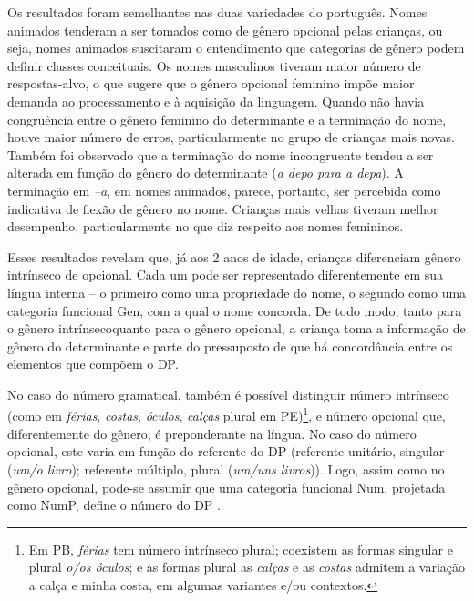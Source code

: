 \documentclass[output=paper]{LSP/langsci}
\begin{document}
Os resultados foram semelhantes nas duas variedades do português. Nomes animados tenderam a ser tomados como de gênero opcional pelas crianças, ou seja, nomes animados suscitaram o entendimento que categorias de gênero podem definir classes conceituais. Os nomes masculinos tiveram maior número de respostas-alvo, o que sugere que o gênero opcional feminino impõe maior demanda ao processamento e à aquisição da linguagem. Quando não havia congruência entre o gênero feminino do determinante e a terminação do nome, houve maior número de erros, particularmente no grupo de crianças mais novas. Também foi observado que a terminação do nome incongruente tendeu a ser alterada em função do gênero do determinante (\textit{a depo para a depa}). A terminação em \textit{–a}, em nomes animados, parece, portanto, ser percebida como indicativa de flexão de gênero no nome. Crianças mais velhas tiveram melhor desempenho, particularmente no que diz respeito aos nomes femininos. 


Esses resultados revelam que, já aos 2 anos de idade, crianças diferenciam gênero intrínseco de opcional. Cada um pode ser representado diferentemente em sua língua interna – o primeiro como uma propriedade do nome, o segundo como uma categoria funcional Gen, com a qual o nome concorda. De todo modo, tanto para o gênero intrínseco\largerpage quanto para o gênero opcional, a criança toma a informação de gênero do determinante e parte do pressuposto de que há concordância entre os elementos que compõem o DP.

No caso do número gramatical, também é possível distinguir número intrínseco (como em \textit{férias}, \textit{costas}, \textit{óculos}, \textit{calças} plural em PE)\footnote{Em PB, \textit{férias} tem número intrínseco plural; coexistem as formas singular e plural \textit{o/os óculos}; e as formas plural as \textit{calças} e as \textit{costas} admitem a variação a calça e minha costa, em algumas variantes e/ou contextos.}, e número opcional que, diferentemente do gênero, é preponderante na língua. No caso do número opcional, este varia em função do referente do DP (referente unitário, singular (\textit{um/o livro}); referente múltiplo, plural (\textit{um/uns livros})). Logo, assim como no gênero opcional, pode-se assumir que uma categoria funcional Num, projetada como NumP, define o número do DP \citep{ritter1991,augusto_etal2006}. 
\end{document}

